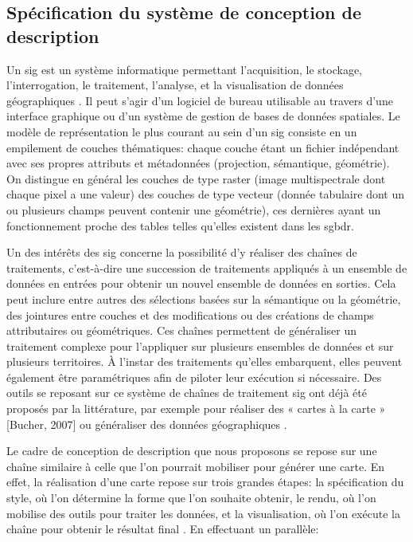 \subsection{Spécification du système de conception de description}

Un \gls{sig} est un système informatique permettant l’acquisition, le stockage, l’interrogation, le traitement, l’analyse, et la visualisation de données géographiques \citep{AschanLeygonie2019}. Il peut s’agir d’un logiciel de bureau utilisable au travers d’une interface graphique ou d’un système de gestion de bases de données spatiales. Le modèle de représentation le plus courant au sein d'un \gls{sig} consiste en un empilement de couches thématiques: chaque couche étant un fichier indépendant avec ses propres attributs et métadonnées (projection, sémantique, géométrie). On distingue en général les couches de type raster (image multispectrale dont chaque pixel a une valeur) des couches de type vecteur (donnée tabulaire dont un ou plusieurs champs peuvent contenir une géométrie), ces dernières ayant un fonctionnement proche des tables telles qu’elles existent dans les \gls{sgbdr}. 

\newpar{}

Un des intérêts des \gls{sig} concerne la possibilité d’y réaliser des chaînes de traitements, c’est-à-dire une succession de traitements appliqués à un ensemble de données en entrées pour obtenir un nouvel ensemble de données en sorties. Cela peut inclure entre autres des sélections basées sur la sémantique ou la géométrie, des jointures entre couches et des modifications ou des créations de champs attributaires ou géométriques. Ces chaînes permettent de généraliser un traitement complexe pour l’appliquer sur plusieurs ensembles de données et sur plusieurs territoires. À l’instar des traitements qu’elles embarquent, elles peuvent également être paramétriques afin de piloter leur exécution si nécessaire. Des outils se reposant sur ce système de chaînes de traitement \gls{sig} ont déjà été proposés par la littérature, par exemple pour réaliser des « cartes à la carte » [Bucher, 2007] ou généraliser des données géographiques \citep{lee2001,petzold2006}.

\newpar{}

Le cadre de conception de description que nous proposons se repose sur une chaîne similaire à celle que l’on pourrait mobiliser pour générer une carte. En effet, la réalisation d’une carte repose sur trois grandes étapes: la spécification du style, où l’on détermine la forme que l’on souhaite obtenir, le rendu, où l’on mobilise des outils pour traiter les données, et la visualisation, où l’on exécute la chaîne pour obtenir le résultat final \cite{christophe2016}. En effectuant un parallèle:

